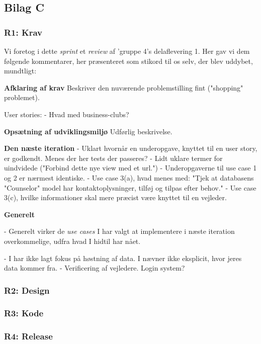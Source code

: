 \documentclass[12pt]{article}
\begin{document}
\subsection{Bilag C}
\label{sec:bilagC}
\subsubsection{R1: Krav}
Vi foretog i dette \textit{sprint} et \textit{review} af 'gruppe 4's delaflevering 1. Her gav vi dem følgende kommentarer, her præsenteret som stikord til os selv, der blev uddybet, mundtligt:

\textbf{Afklaring af krav}
Beskriver den nuværende problemstilling fint ("shopping" problemet).

User stories:
- Hvad med business-clubs?

\textbf{Opsætning af udviklingsmiljø}
Udførlig beskrivelse.

\textbf{Den næste iteration}
- Uklart hvornår en underopgave, knyttet til en user story, er godkendt. Menes der her tests der passeres?
- Lidt uklare termer for uindvidede ("Forbind dette nye view med et url.")
- Underopgaverne til use case 1 og 2 er nærmest identiske.
- Use case 3(a), hvad menes med: "Tjek at databasens "Counselor" model har kontaktoplysninger, tilføj og tilpas efter behov."
- Use case 3(c), hvilke informationer skal mere præcist være knyttet til en vejleder.

\textbf{Generelt}

- Generelt virker de \textit{use cases} I har valgt at implementere i næste iteration overkommelige, udfra hvad I hidtil har nået.

- I har ikke lagt fokus på høstning af data. I nævner ikke eksplicit, hvor jeres data kommer fra.
- Verificering af vejledere. Login system?



\subsubsection{R2: Design}


\subsubsection{R3: Kode}
\subsubsection{R4: Release}
\end{document}
